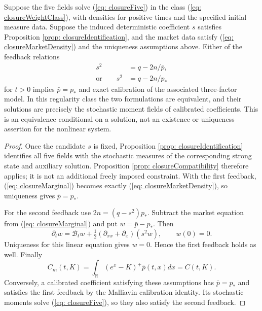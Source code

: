 \begin{thm}
\label{thm: closureNonlinear}
Suppose the five fields solve (\ref{eq: closureFive}) in the class
(\ref{eq: closureWeightClass}), with densities for positive times and the
specified initial measure data. Suppose the induced deterministic coefficient $s$
satisfies Proposition \ref{prop: closureIdentification}, and the market data
satisfy (\ref{eq: closureMarketDensity}) and the uniqueness assumptions above.
Either of the feedback relations
\begin{align}
s^2&=q-2n/\bar p,\label{eq: closureTwoFeedbacks}\\
\text{or}\qquad s^2&=q-2n/p_*\label{eq: closureKnownDenominator}
\end{align}
for $t>0$ implies $\bar p=p_*$ and exact calibration of the associated
three-factor model. In this regularity class the two formulations are
equivalent, and their solutions are precisely the stochastic moment fields
of calibrated coefficients. This is an equivalence conditional on a solution,
not an existence or uniqueness assertion for the nonlinear system.
\end{thm}
\begin{proof}
Once the candidate $s$ is fixed, Proposition \ref{prop: closureIdentification}
identifies all five fields with the stochastic measures of the corresponding
strong state and auxiliary solution. Proposition \ref{prop: closureCompatibility}
therefore applies; it is not an additional freely imposed constraint.
With the first feedback, (\ref{eq: closureMarginal}) becomes exactly
(\ref{eq: closureMarketDensity}), so uniqueness gives $\bar p=p_*$.

For the second feedback use $2n=(q-s^2)p_*$. Subtract the market equation from
(\ref{eq: closureMarginal}) and put $w=\bar p-p_*$. Then
\begin{equation}\label{eq: closureDifference}
\partial_t w=\mathcal B_t w+
       \tfrac12(\partial_{xx}+\partial_x)(s^2w),\qquad w(0)=0.
\end{equation}
Uniqueness for this linear equation gives $w=0$. Hence the first feedback holds
as well. Finally
\[
C_m(t,K)=\int_{\mathbb R}(e^x-K)^+\bar p(t,x)dx=C(t,K).
\]
Conversely, a calibrated coefficient satisfying these assumptions has
$\bar p=p_*$ and satisfies the first feedback by the Malliavin calibration
identity. Its stochastic moments solve (\ref{eq: closureFive}), so they also
satisfy the second feedback.
\end{proof}

